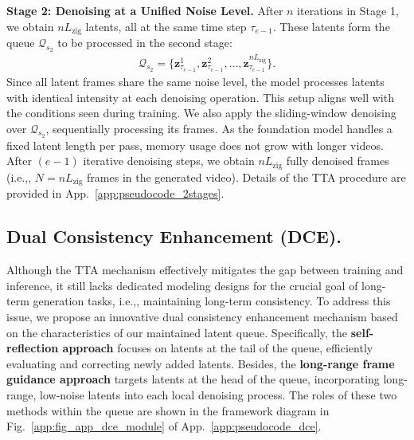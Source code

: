 \documentclass{llmxive}
\providecommand{\ie}{i.e.,\xspace}
\begin{document}
\textbf{Stage 2: Denoising at a Unified Noise Level.}
After $n$ iterations in Stage 1, we obtain $nL_{\mathrm{zig}}$ latents, all at the same time step $\tau_{e-1}$. These latents form the queue $\mathcal{Q}_{s_2}$ to be processed in the second stage:
\begin{align}
\mathcal{Q}_{s_2} = \{\mathbf{z}^1_{\tau_{e-1}}, \mathbf{z}^2_{\tau_{e-1}}, \ldots, \mathbf{z}^{nL_{\mathrm{zig}}}_{\tau_{e-1}}\}.
\end{align}
Since all latent frames share the same noise level, the model processes latents with identical intensity at each denoising operation. This setup aligns well with the conditions seen during training. 
We also apply the sliding-window denoising over $\mathcal{Q}_{s_2}$, sequentially processing its frames. As the foundation model handles a fixed latent length per pass, memory usage does not grow with longer videos.  
After $(e-1)$ iterative denoising steps, we obtain $nL_{\mathrm{zig}}$ fully denoised frames (\ie, $N = nL_{\mathrm{zig}}$ frames in the generated video).  
Details of the TTA procedure are provided in App.~\ref{app:pseudocode_2stages}.




\subsection{Dual Consistency Enhancement (DCE).}
\label{sec_3_3}
Although the TTA mechanism effectively mitigates the gap between training and inference, it still lacks dedicated modeling designs for the crucial goal of long-term generation tasks, \ie, maintaining long-term consistency.
To address this issue, we propose an innovative dual consistency enhancement mechanism based on the characteristics of our maintained latent queue.
Specifically, the \textbf{self-reflection approach} focuses on latents at the tail of the queue, efficiently evaluating and correcting newly added latents. 
Besides, the \textbf{long-range frame guidance approach} targets latents at the head of the queue, incorporating long-range, low-noise latents into each local denoising process.
The roles of these two methods within the queue are shown in the framework diagram in Fig.~\ref{app:fig_app_dce_module} of App.~\ref{app:pseudocode_dce}.



\end{document}

